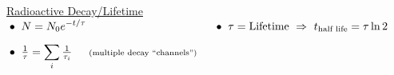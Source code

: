 \documentclass[12pt]{article}
\begin{document}
\vspace{20pt}\noindent
\underline{Radioactive Decay/Lifetime}\\[10pt]
\(
    \begin{aligned}[t]
        & \bullet\ N = N_0 e^{-t/\tau}\\[5pt]
        & \bullet\ \tfrac{1}{\tau} = \sum_i \tfrac{1}{\tau_i} \indent \text{\scriptsize(multiple decay ``channels'')}
    \end{aligned}
    \hspace{15pt}
    \begin{aligned}[t]
        & \bullet\ \tau = \text{Lifetime} \ \Rightarrow\ t_{\text{half life}} = \tau \ln{2}
    \end{aligned}
\)

\newpage
\end{document}
